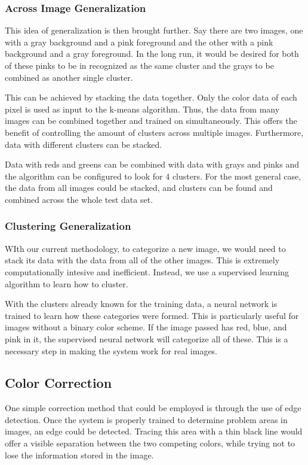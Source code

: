 \documentclass[12pt]{article}
\begin{document}
\subsubsection{Across Image Generalization}
This idea of generalization is then brought further. Say there are two images, one with a gray background and a pink foreground and the other with a pink background and a gray foreground. In the long run, it would be desired for both of these pinks to be in recognized as the same cluster and the grays to be combined as another single cluster. 

This can be achieved by stacking the data together. Only the color data of each pixel is used as input to the k-means algorithm. Thus, the data from many images can be combined together and trained on simultaneously. This offers the benefit of controlling the amount of clusters across multiple images. Furthermore, data with different clusters can be stacked.

Data with reds and greens can be combined with data with grays and pinks and the algorithm can be configured to look for 4 clusters. For the most general case, the data from all images could be stacked, and clusters can be found and combined across the whole test data set.

\subsubsection{Clustering Generalization}
WIth our current methodology, to categorize a new image, we would need to stack its data with the data from all of the other images. This is extremely computationally intesive and inefficient. Instead, we use a supervised learning algorithm to learn how to cluster.

With the clusters already known for the training data, a neural network is trained to learn how these categories were formed. This is particularly useful for images without a binary color scheme. If the image passed has red, blue, and pink in it, the supervised neural network will categorize all of these. This is a necessary step in making the system work for real images.



\subsection{Color Correction}

One simple correction method that could be employed is through the use of edge detection. Once the system is properly trained to determine problem areas in images, an edge could be detected. Tracing this area with a thin black line would offer a visible separation between the two competing colors, while trying not to lose the information stored in the image.
\end{document}
